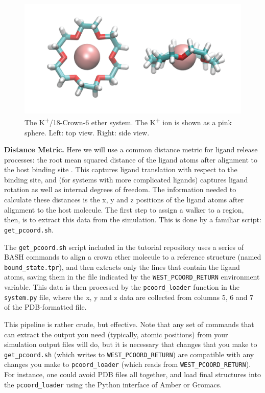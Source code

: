 \documentclass[9pt,tutorial]{livecoms}
\begin{document}
\begin{figure}
\includegraphics[width=\linewidth]{Figure12.png}
\caption{The K\textsuperscript{+}/18-Crown-6 ether system. 
The K\textsuperscript{+} ion is shown as a pink sphere. Left: top view. Right: side view.}
\label{fig:view}
\end{figure}

\textbf{Distance Metric.} Here we will use a common distance metric for ligand release processes: the root mean squared distance of the ligand atoms after alignment to the host binding site \citep{Dickson2017,Dixon2018,Dickson2018}.
This captures ligand translation with respect to the binding site, and (for systems with more complicated ligands) captures ligand rotation as well as internal degrees of freedom. 
The information needed to calculate these distances is the x, y and z positions of the ligand atoms after alignment to the host molecule. 
The first step to assign a walker to a region, then, is to extract this data from the simulation. 
This is done by a familiar script: \verb|get_pcoord.sh|.

The \verb|get_pcoord.sh| script included in the tutorial repository uses a series of BASH commands to align a crown ether molecule to a reference structure (named \verb|bound_state.tpr|), and then extracts only the lines that contain the ligand atoms, saving them in the file indicated by the \verb|WEST_PCOORD_RETURN| environment variable. 
This data is then processed by the \verb|pcoord_loader| function in the \verb|system.py| file, where the x, y and z data are collected from columns 5, 6 and 7 of the PDB-formatted file. 

This pipeline is rather crude, but effective. 
Note that any set of commands that can extract the output you need (typically, atomic positions) from your simulation output files will do, but it is necessary that changes that you make to \verb|get_pcoord.sh| (which writes to \verb|WEST_PCOORD_RETURN|) are compatible with any changes you make to \verb|pcoord_loader| (which reads from \verb|WEST_PCOORD_RETURN|). 
For instance, one could avoid PDB files all together, and load final structures into the \verb|pcoord_loader| using the Python interface of Amber or Gromacs.
\end{document}
